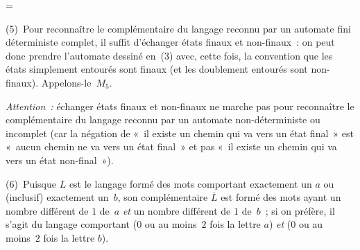 \documentclass[12pt,a4paper]{article}
\theoremstyle{definition}
\newif\ifcorrige
\newenvironment{corrige}%
{\ifcorrige\relax\else\setbox0=\vbox\bgroup\fi%
\smallbreak\footnotesize\noindent{\underbar{\textit{Corrigé.}}\quad}}
{{\hbox{}\nobreak\hfill\checkmark}%
\ifcorrige\relax\else\egroup\fi\par}
\begin{document}
\begin{corrige}
\smallbreak

(5) Pour reconnaître le complémentaire du langage reconnu par un
automate fini déterministe complet, il suffit d'échanger états finaux
et non-finaux : on peut donc prendre l'automate dessiné en (3) avec,
cette fois, la convention que les états simplement entourés sont
finaux (et les doublement entourés sont non-finaux).
Appelons-le $M_5$.

\emph{Attention :} échanger états finaux et non-finaux ne marche pas
pour reconnaître le complémentaire du langage reconnu par un automate
non-déterministe ou incomplet (car la négation de « il existe un
chemin qui va vers un état final » est « aucun chemin ne va vers un
état final » et pas « il existe un chemin qui va vers un état
non-final »).

\smallbreak

(6) Puisque $L$ est le langage formé des mots comportant exactement un
$a$ ou (inclusif) exactement un $b$, son complémentaire $\overline{L}$
est formé des mots ayant un nombre différent de $1$ de $a$ \emph{et}
un nombre différent de $1$ de $b$ ; si on préfère, il s'agit du
langage comportant ($0$ ou au moins $2$ fois la lettre $a$) \emph{et}
($0$ ou au moins $2$ fois la lettre $b$).

\smallbreak


\end{corrige}
\end{document}
